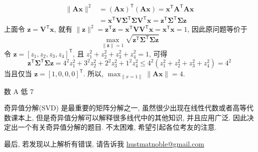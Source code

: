 \documentclass[a4paper, 12pt, UTF8]{ctexart}
\begin{document}
{\begin{solution}
\begin{itemize}
          \[
              \begin{aligned}
                  \lVert \boldsymbol{A}\bm{x} \rVert^{2} &= (\boldsymbol{A}\bm{x})^{\mathsf T}(\boldsymbol{A}\bm{x}) = \bm{x}^{\mathsf T}\boldsymbol{A}^{\mathsf T}\boldsymbol{A} \bm{x} \\
                  &= \bm{x}^{\mathsf T} \boldsymbol{V\Sigma}^{\mathsf
                    T} \boldsymbol{\Sigma V}^{\mathsf T} \bm{x}
                  =\bm{z}^{\mathsf T} \boldsymbol{\Sigma}^{\mathsf T}
                  \boldsymbol{\Sigma} \bm{z}
              \end{aligned}
          \]
          上面令 $\bm{z}=\boldsymbol{V}^{\mathsf
            T}\bm{x}$, 就有
          $\lVert \bm{z} \rVert^{2} = \bm{z}^{\mathsf T}\bm{z} =
          \bm{x}^{\mathsf T}\boldsymbol{V}\boldsymbol{V}^{\mathsf
            T}\bm{x} = \bm{x}^{\mathsf T}\bm{x} = 1$, 因此原问题等价于
          \[
              \max_{\lVert \bm{z} \rVert=1} \sqrt{\bm{z}^{\mathsf T}
                \boldsymbol{\Sigma}^{\mathsf T} \boldsymbol{\Sigma}
                \bm{z}}
          \]
          令 $\bm{z} = [z_{1}, z_{2}, z_{3}, z_{4}]^{\mathsf T}$, 且 $z_{1}^{2} + z_{2}^{2} +z_{3}^{2}+z_{4}^{2}=1$, 可得
          \[
              \bm{z}^{\mathsf T}
                \boldsymbol{\Sigma}^{\mathsf T} \boldsymbol{\Sigma}
                \bm{z} = 4^{2}z_{1}^{2} + 3^{2}z_{2}^{2} +  2^{2}z_{3}^{2} +  1^{2}z_{4}^{2} \leq 4^{2}(z_{1}^{2} + z_{2}^{2} +z_{3}^{2}+z_{4}^{2}) = 4^{2}
            \]
            当且仅当 $\bm{z} = [1,0,0,0]^{\mathsf T}$. 所以, $\max_{\lVert x=1 \rVert}\lVert \boldsymbol{A}\bm{x}\rVert = 4$.
          
      \end{itemize}
  \end{solution}
}
{\color{GoogleGreen} 数 A 低 7

}

\vspace{4em}
\begin{thm}{}{}{\adkaiti
    奇异值分解(SVD) 是最重要的矩阵分解之一, 虽然很少出现在线性代数或者高等代数课本上, 但是奇异值分解可以解释很多线代中的其他知识, 并且应用广泛. 因此决定出一个有关奇异值分解的题目. 不太困难, 希望引起各位考友的注意.
}
\end{thm}

\vspace{4em}

最后, 若发现以上解析有错误, 请告诉我 \href{mailto:hustmatnoble@gmail.com}{hustmatnoble@gmail.com}
\end{document}
